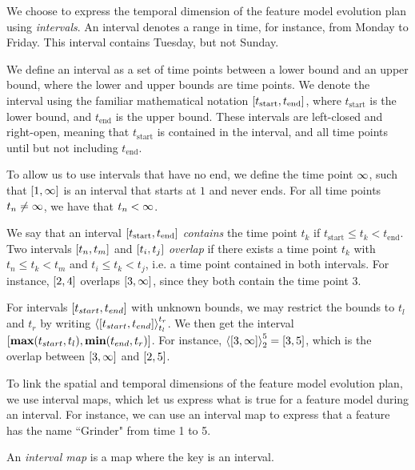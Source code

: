 We choose to express the temporal dimension of the feature model evolution plan using \emph{intervals}. An interval denotes a range in time, for instance, from Monday to Friday. This interval contains Tuesday, but not Sunday.
\begin{definition}[Interval]
  We define an interval as a set of time points between a lower bound and an upper bound, where the lower and upper bounds are time points. We denote the interval using the familiar mathematical notation $\interval{t_\text{start}}{t_\text{end}}$, where $t_\text{start}$ is the lower bound, and $t_\text{end}$ is the upper bound. These intervals are left-closed and right-open, meaning that $t_\text{start}$ is contained in the interval, and all time points until but not including $t_\text{end}$.
  \label{def:interval}
\end{definition}

To allow us to use intervals that have no end, we define the time point $\infty$, such that $\interval{1}{\forever}$ is an interval that starts at $1$ and never ends. For all time points $t_n \neq \infty$, we have that $t_n < \infty$. 

We say that an interval $\interval{t_\text{start}}{t_\text{end}}$ \emph{contains} the time point $t_k$ if $t_\text{start} \leq t_k < t_\text{end}$. Two intervals $\interval{t_n}{t_m}$ and $\interval{t_i}{t_j}$ \emph{overlap} if there exists a time point $t_k$ with $t_n \leq t_k < t_m$ and $t_i \leq t_k < t_j$, i.e. a time point contained in both intervals. For instance, $\interval{2}{4}$ overlaps $\interval{3}{\forever}$, since they both contain the time point 3.

For intervals $\interval{t_{start}}{t_{end}}$ with unknown bounds, we may restrict the bounds to $t_l$ and $t_r$ by writing $\clamp{\interval{t_{start}}{t_{end}}}{t_l}{t_r}$. We then get the interval $\interval{\textbf{max}(t_{start}, t_l)}{\textbf{min}(t_{end}, t_r)}$. For instance, $\clamp{\interval{3}{\forever}}{2}{5} = \interval{3}{5}$, which is the overlap between $\interval{3}{\forever}$ and $\interval{2}{5}$.


To link the spatial and temporal dimensions of the feature model evolution plan, we use interval maps, which let us express what is true for a feature model during an interval. For instance, we can use an interval map to express that a feature has the name ``Grinder" from time 1 to 5.
\\

\begin{definition}
An \emph{interval map} is a map where the key is an interval. 
  \label{def:interval-map}
\end{definition}

